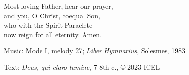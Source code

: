 \hymn



\begin{underhymnverse}
Most loving Father, hear our prayer,\\
and you, O Christ, coequal Son,\\
who with the Spirit Paraclete\\
now reign for all eternity. Amen.
\end{underhymnverse}


\begin{hymnsource}
Music: Mode I, melody 27; \emph{Liber Hymnarius}, Solesmes, 1983

Text: \emph{Deus, qui claro lumine}, 7-8th c., © 2023 ICEL
\end{hymnsource}
